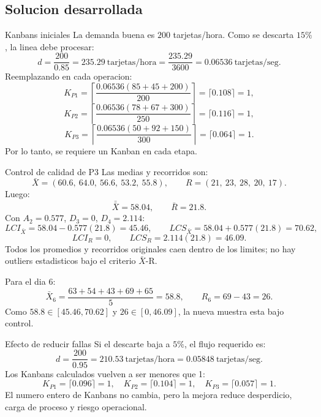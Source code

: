 \subsection{Solucion desarrollada}

\begin{respuesta}{Kanbans iniciales}
La demanda buena es \(200\) tarjetas/hora. Como se descarta \(15\%\), la linea debe procesar:
\[
d=\frac{200}{0.85}=235.29\ \text{tarjetas/hora}
=\frac{235.29}{3600}=0.06536\ \text{tarjetas/seg}.
\]
Reemplazando en cada operacion:
\[
K_{P1}=\left\lceil\frac{0.06536(85+45+200)}{200}\right\rceil
=\lceil 0.108\rceil=1,
\]
\[
K_{P2}=\left\lceil\frac{0.06536(78+67+300)}{250}\right\rceil
=\lceil 0.116\rceil=1,
\]
\[
K_{P3}=\left\lceil\frac{0.06536(50+92+150)}{300}\right\rceil
=\lceil 0.064\rceil=1.
\]
Por lo tanto, se requiere un Kanban en cada etapa.
\end{respuesta}

\begin{respuesta}{Control de calidad de P3}
Las medias y recorridos son:
\[
\bar X=(60.6,\ 64.0,\ 56.6,\ 53.2,\ 55.8),
\qquad
R=(21,\ 23,\ 28,\ 20,\ 17).
\]
Luego:
\[
\bar{\bar X}=58.04,\qquad \bar R=21.8.
\]
Con \(A_2=0.577\), \(D_3=0\), \(D_4=2.114\):
\[
LCI_{\bar X}=58.04-0.577(21.8)=45.46,
\qquad
LCS_{\bar X}=58.04+0.577(21.8)=70.62,
\]
\[
LCI_R=0,\qquad LCS_R=2.114(21.8)=46.09.
\]
Todos los promedios y recorridos originales caen dentro de los limites; no hay outliers estadisticos bajo el criterio \(\bar X\)-R.

Para el dia 6:
\[
\bar X_6=\frac{63+54+43+69+65}{5}=58.8,\qquad R_6=69-43=26.
\]
Como \(58.8\in[45.46,70.62]\) y \(26\in[0,46.09]\), la nueva muestra esta bajo control.
\end{respuesta}

\begin{respuesta}{Efecto de reducir fallas}
Si el descarte baja a \(5\%\), el flujo requerido es:
\[
d=\frac{200}{0.95}=210.53\ \text{tarjetas/hora}
=0.05848\ \text{tarjetas/seg}.
\]
Los Kanbans calculados vuelven a ser menores que 1:
\[
K_{P1}=\lceil 0.096\rceil=1,\quad
K_{P2}=\lceil 0.104\rceil=1,\quad
K_{P3}=\lceil 0.057\rceil=1.
\]
El numero entero de Kanbans no cambia, pero la mejora reduce desperdicio, carga de proceso y riesgo operacional.
\end{respuesta}
